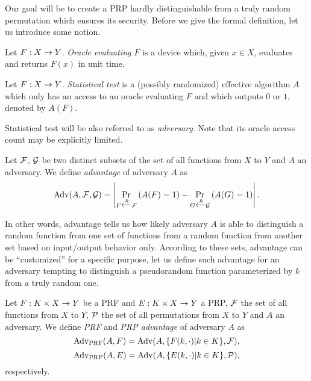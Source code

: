 Our goal will be to create a PRP hardly distinguishable from a truly random permutation which ensures its security. Before we give the formal definition, let us introduce some notion.

\begin{defn}[Oracle]
	Let $F:X\rightarrow Y$. {\em Oracle evaluating $F$} is a device which, given $x\in X$, evaluates and returns $F(x)$ in unit time.
\end{defn}

\begin{defn}   %
	Let $F:X\rightarrow Y$. {\em Statistical test} is a (possibly randomized) effective algorithm $A$ which only has an access to an oracle evaluating $F$ and which outputs $0$ or $1$, denoted by $A(F)$.
\end{defn}

\begin{note}
	Statistical test will be also referred to as {\em adversary}. Note that its oracle access count may be explicitly limited.
\end{note}


\begin{defn}[Advantage]
\label{def:advant}
	Let $\cal F$, $\cal G$ be two distinct subsets of the set of all functions from $X$ to $Y$ and $A$ an adversary. We define {\em advantage} of adversary $A$ as
	\[
		\operatorname*{Adv}(A,{\cal F},{\cal G}) = \left| \Pr\limits_{F\xleftarrow{R} {\cal F}}\left(A(F)=1\right) - \Pr\limits_{G\xleftarrow{R} {\cal G}}\left(A(G)=1\right) \right| .
	\]
\end{defn}

In other words, advantage tells us how likely adversary $A$ is able to distinguish a random function from one set of functions from a random function from another set based on input/output behavior only. According to these sets, advantage can be ``customized'' for a specific purpose, let us define such advantage for an adversary tempting to distinguish a pseudorandom function parameterized by $k$ from a truly random one.

\begin{defn}
\label{def:prfadvant}\label{def:prpadvant}
	Let $F: K\times X\rightarrow Y$ be a PRF and $E: K\times X\rightarrow Y$ a PRP, $\cal F$ the set of all functions from $X$ to $Y$, $\cal P$ the set of all permutations from $X$ to $Y$ and $A$ an adversary. We define {\em PRF} and {\em PRP advantage} of adversary $A$ as
	\[
		\operatorname*{Adv_{PRF}}(A,F) = \operatorname*{Adv}(A,\{F(k,\cdot)|k\in K\},{\cal F}) ,
	\]
	\[
		\operatorname*{Adv_{PRP}}(A,E) = \operatorname*{Adv}(A,\{E(k,\cdot)|k\in K\},{\cal P}) ,
	\]
	respectively.
\end{defn}

